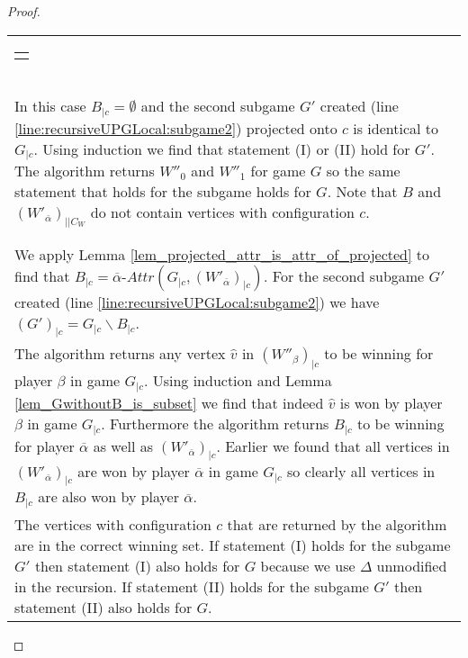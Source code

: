 \begin{theorem}
\begin{proof}
\begin{longtable}{|p{14.2cm}}
\begin{tabular}{|p{14cm}}
\begin{tabular}{|p{13.8cm}}
				\end{tabular}\\\\
				\begin{tabular}{|p{13.8cm}}
					Assume $c \notin C_B$\\
					\hline
					\begin{tabular}{|p{13.6cm}}
						Assume $(W'_{\overline{\alpha}})_{|c} = \emptyset$\\
						\hline
						In this case $B_{|c} = \emptyset$ and the second subgame $G'$ created (line \ref{line:recursiveUPGLocal:subgame2}) projected onto $c$ is identical to $G_{|c}$. Using induction we find that statement (I) or (II) hold for $G'$. The algorithm returns $W''_0$ and $W''_1$ for game $G$ so the same statement that holds for the subgame holds for $G$. Note that $B$ and $(W'_{\overline{\alpha}})_{||C_W}$ do not contain vertices with configuration $c$.
					\end{tabular}\\\\
					\begin{tabular}{|p{13.6cm}}
						Assume $(W'_{\overline{\alpha}})_{|c} \neq \emptyset$\\
						\hline
						We apply Lemma \ref{lem_projected_attr_is_attr_of_projected} to find that $B_{|c} = \overline{\alpha}\textit{-Attr}(G_{|c},(W'_{\overline{\alpha}})_{|c})$. For the second subgame $G'$ created (line \ref{line:recursiveUPGLocal:subgame2}) we have $(G')_{|c} = G_{|c} \backslash B_{|c}$.\\
						The algorithm returns any vertex $\hat{v}$ in $(W''_\beta)_{|c}$ to be winning for player $\beta$ in game $G_{|c}$. Using induction and Lemma \ref{lem_GwithoutB_is_subset} we find that indeed $\hat{v}$ is won by player $\beta$ in game $G_{|c}$. Furthermore the algorithm returns $B_{|c}$ to be winning for player $\overline{\alpha}$ as well as $(W'_{\overline{\alpha}})_{|c}$. Earlier we found that all vertices in $(W'_{\overline{\alpha}})_{|c}$ are won by player $\overline{\alpha}$ in game $G_{|c}$ so clearly all vertices in $B_{|c}$ are also won by player $\overline{\alpha}$.\\
						The vertices with configuration $c$ that are returned by the algorithm are in the correct winning set. If statement (I) holds for the subgame $G'$ then statement (I) also holds for $G$ because we use $\Delta$ unmodified in the recursion. If statement (II) holds for the subgame $G'$ then statement (II) also holds for $G$.
					\end{tabular}
				\end{tabular}
			\end{tabular}
		\end{longtable}
	\end{proof}
\end{theorem}

